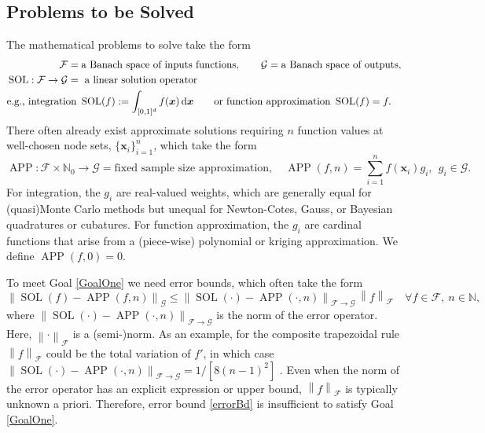 \documentclass[11pt]{NSFamsart}
\newcommand{\naturals}{{\mathbb{N}}}
\newcommand{\cube}{[0,1]^d}
\newcommand{\design}{\{\bx_i\}_{i=1}^n}
\DeclareMathOperator{\SOL}{SOL}
\DeclareMathOperator{\APP}{APP}
\newcommand{\bx}{{\boldsymbol{x}}}
\def\dif{\textup{d}}
\newcommand{\calf}{{\mathcal{F}}}
\newcommand{\calg}{{\mathcal{G}}}
\newcommand{\norm}[2][{}]{\ensuremath{\left \lVert #2 \right \rVert}_{#1}}
\begin{document}
\subsection{Problems to be Solved} \label{sec:Problems}

The mathematical problems to solve take the form 
\begin{align*}
    \calf & = \text{a Banach space of inputs functions}, \qquad 
    \calg = \text{a Banach space of outputs}, \\
    \SOL : \calf  \to \calg & = \text{ a linear solution operator} \\
    \nonumber
    \MoveEqLeft[6]{\text{e.g., integration }\SOL(f) := \int_{\cube} f(\bx) \, \dif \bx
    \qquad \text{or function approximation } \SOL(f) = f.}
\end{align*}
There often already exist approximate solutions requiring $n$ function values at well-chosen node sets, $\design$, which take the form
\begin{equation}
    \APP: \calf \times \naturals_0 \to \calg = \text{fixed sample size approximation}, \quad \APP(f,n) = \sum_{i=1}^n f(\bx_i) g_i, \ \ g_i \in \calg.
\end{equation}
For integration, the $g_i$ are real-valued weights, which are generally equal for (quasi\Hyphdash*)Monte Carlo methods but unequal for Newton-Cotes, Gauss, or Bayesian quadratures or cubatures.  For function approximation, the $g_i$ are cardinal functions that arise from a (piece-wise) polynomial or kriging approximation. We define $\APP(f,0) = 0$.

To meet Goal \ref{GoalOne} we need error bounds, which often take the form
\begin{equation}  \tag{ERR-BD} \label{errorBd}
    \norm[\calg]{\SOL(f) - \APP(f,n)} \le \norm[\calf \to \calg]{\SOL(\cdot) - \APP(\cdot,n)} \, \norm[\calf]{f} \quad \forall f\in \calf, \ n \in \naturals,
\end{equation}
where $\norm[\calf \to \calg]{\SOL(\cdot) - \APP(\cdot,n)}$ is the norm of the error operator.  Here, $\norm[\calf]{\cdot}$ is a (semi-)norm.  As an example, for the composite trapezoidal rule $\norm[\calf]{f}$ could be the total variation of $f'$, in which case $\norm[\calf \to \calg]{\SOL(\cdot) - \APP(\cdot,n)} = 1/[8 (n-1)^2]$ \cite[Sect.\ 7.2, (7.15)]{BraPet11a}.  Even when the norm of the error operator has an explicit expression or upper bound, $\norm[\calf]{f}$ is typically unknown a priori.  Therefore, error bound \eqref{errorBd} is insufficient to satisfy Goal \ref{GoalOne}. 
\end{document}

